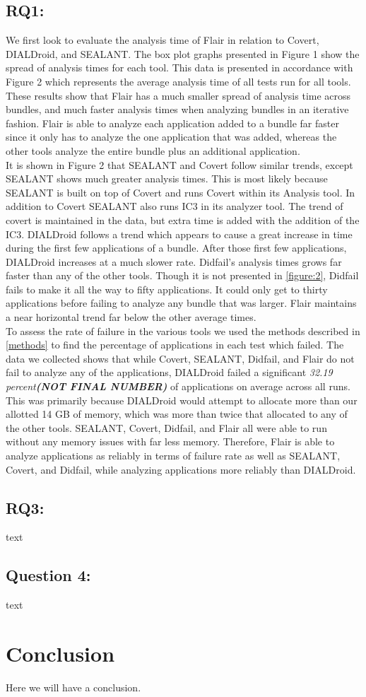 \documentclass[twocolumn]{article}
\begin{document}
	\subsection{RQ1:}
		We first look to evaluate the analysis time of Flair in relation to Covert, DIALDroid, and SEALANT. The box plot graphs presented in Figure 1 show the spread of analysis times for each tool. This data is presented in accordance with Figure 2 which represents the average analysis time of all tests run for all tools. These results show that Flair has a much smaller spread of analysis time across bundles, and much faster analysis times when analyzing bundles in an iterative fashion. Flair is able to analyze each application added to a bundle far faster since it only has to analyze the one application that was added, whereas the other tools analyze the entire bundle plus an additional application.\\
		It is shown in Figure 2 that SEALANT and Covert follow similar trends, except SEALANT shows much greater analysis times. This is most likely because SEALANT is built on top of Covert and runs Covert within its Analysis tool. In addition to Covert SEALANT also runs IC3 in its analyzer tool. The trend of covert is maintained in the data, but extra time is added with the addition of the IC3. DIALDroid follows a trend which appears to cause a great increase in time during the first few applications of a bundle. After those first few applications, DIALDroid increases at a much slower rate. Didfail's analysis times grows far faster than any of the other tools. Though it is not presented in \ref{figure:2}, Didfail fails to make it all the way to fifty applications. It could only get to thirty applications before failing to analyze any bundle that was larger. Flair maintains a near horizontal trend far below the other average times.\\
		
		To assess the rate of failure in the various tools we used the methods described in \ref{methods} to find the percentage of applications in each test which failed. The data we collected shows that while Covert, SEALANT, Didfail, and Flair do not fail to analyze any of the applications, DIALDroid failed a significant \textit{32.19 percent\textbf{(NOT FINAL NUMBER)}} of applications on average across all runs. This was primarily because DIALDroid would attempt to allocate more than our allotted 14 GB of memory, which was more than twice that allocated to any of the other tools. SEALANT, Covert, Didfail, and Flair all were able to run without any memory issues with far less memory. Therefore, Flair is able to analyze applications as reliably in terms of failure rate as well as SEALANT, Covert, and Didfail, while analyzing applications more reliably than DIALDroid.
		
	\subsection{RQ3:}
		text
	\subsection{Question 4:}
		text


\section[3]{Conclusion}
Here we will have a conclusion.
\end{document}
